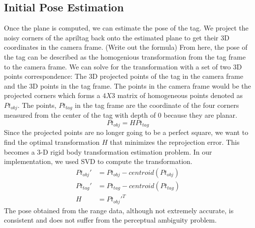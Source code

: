 \subsection{Initial Pose Estimation}
Once the plane is computed, we can estimate the pose of the tag. We project the noisy corners of the apriltag back onto the estimated plane to get their 3D coordinates in the camera frame. (Write out the formula) From here, the pose of the tag can be described as the homogenious transformation from the tag frame to the camera frame. We can solve for the transformation with a set of two 3D points correspondence: The 3D projected points of the tag in the camera frame and the 3D points in the tag frame. The points in the camera frame would be the projected corners which forms a $4X3$ matrix of homogeneous points denoted as $Pt_{obj}$. The points, $Pt_{tag}$ in the tag frame are the coordinate of the four corners measured from the center of the tag with depth of 0 because they are planar. 
$$Pt_{obj} = H Pt_{tag}$$
Since the projected points are no longer going to be a perfect square, we want to find the optimal transformation $H$ that minimizes the reprojection error. 
This becomes a 3-D rigid body transformation estimation problem. In our implementation, we used SVD to compute the transformation.
\begin{align*}
Pt_{obj}'&=Pt_{obj} - centroid(Pt_{obj})\\
Pt_{tag}'&=Pt_{tag} - centroid(Pt_{tag})\\
H &= Pt_{obj}'^{T}   
\end{align*}
The pose obtained from the range data, although not extremely accurate, is consistent and does not suffer from the perceptual ambiguity problem. 

